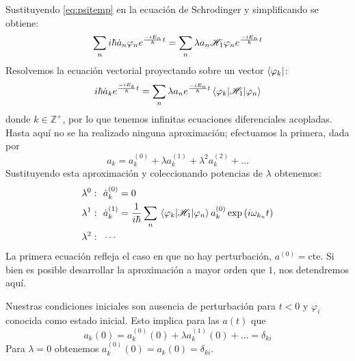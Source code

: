 Sustituyendo \eqref{eq:psitemp} en la ecuación de Schrodinger y
simplificando se
obtiene:
\begin{equation}
  \sum_{n} i \hbar \dot{a}_n \varphi_n e^{\frac{-iE_n}{\hbar}t} = \sum_{n}  \lambda a_n \mathscr{H}_1 \varphi_n e^{\frac{-iE_n}{\hbar}t} 
\end{equation}
Resolvemos la ecuación vectorial proyectando sobre un vector
$\bra{\varphi_k}$:
\begin{equation}
  i \hbar\dot{a}_k e^{\frac{-iE_k}{\hbar}t} = \sum_{n} \lambda a_n
  e^{\frac{-iE_n}{\hbar}t} \mel{\varphi_k}{\mathscr{H}_1}{\varphi_n}
\end{equation}
donde $k\in \mathbb{Z}^+$, por lo que tenemos infinitas ecuaciones
diferenciales acopladas. Hasta aquí no se ha realizado ninguna
aproximación; efectuamos la primera, dada por
\begin{equation}
  a_k = a_k^{(0)} + \lambda a_k^{(1)} + \lambda^2 a_k^{(2)} + \ldots
\end{equation}
Sustituyendo esta aproximación y coleccionando potencias de $\lambda$
obtenemos:
\begin{equation}
  \begin{split}
    \lambda^0:\ \ & \dot{a}_k^{(0)} = 0 \\ 
    \lambda^1:\ \ & \dot{a}_k^{(1)} = \frac{1}{i \hbar} \sum_{n}
    \matrixel{\varphi_k}{\Ham_1}{ \varphi_n} a_k^{(0)} \exp \left(i\omega_{k_n} t \right) \\ 
    \lambda^2: \ \ & \cdots
  \end{split}
\end{equation}
La primera ecuación refleja el caso en que no hay perturbación,
$a^{(0)}=\text{cte.}$ Si bien es posible desarrollar la aproximación a
mayor orden que $1$, nos detendremos aquí.

Nuestras condiciones iniciales son ausencia de perturbación para $t<0$
y $\varphi_i$ conocida como estado inicial. Esto implica para las $a(t)$ que
\begin{equation}
  a_k(0)  = a_k^{(0)}(0) +\lambda a_k^{(1)}(0) + \ldots = \delta_{ki}
\end{equation}
Para $\lambda=0$ obtenemos $a_k^{(0)}(0)=a_k(0)=\delta_{ki}$.

